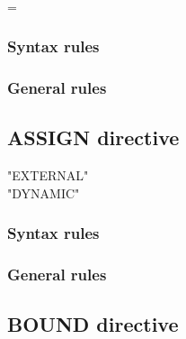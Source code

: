 \begin{syntax}[\miscextcolour]
  \begin{1=}
     \\
  \end{1=}
  \literal = \literal
\end{syntax}

\subsubsection{Syntax rules}

\subsubsection{General rules}

\subsection{ASSIGN directive}

\begin{syntax}[\miscextcolour]
  \begin{1=}
    "EXTERNAL" \\
    "DYNAMIC"
  \end{1=}
\end{syntax}

\subsubsection{Syntax rules}

\subsubsection{General rules}

\subsection{BOUND directive}

\begin{syntax}[\miscextcolour]
   \\
\end{syntax}

\begin{syntax}[\miscextcolour]
  \begin{1=}
     \\
  \end{1=}
\end{syntax}

